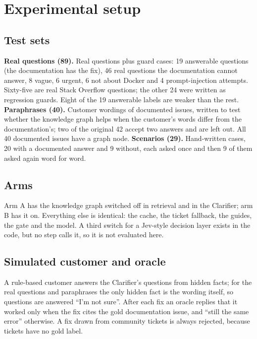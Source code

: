 \documentclass[cameraready]{ieeeconf}
\begin{document}
\section{Experimental setup}\label{sec:setup}
\subsection{Test sets}
\textbf{Real questions (89).} Real questions plus guard cases: 19 answerable questions (the documentation has the fix), 46 real questions the documentation cannot answer, 8 vague, 6 urgent, 6 not about Docker and 4 prompt-injection attempts. Sixty-five are real Stack Overflow questions; the other 24 were written as regression guards. Eight of the 19 answerable labels are weaker than the rest. \textbf{Paraphrases (40).} Customer wordings of documented issues, written to test whether the knowledge graph helps when the customer's words differ from the documentation's; two of the original 42 accept two answers and are left out. All 40 documented issues have a graph node. \textbf{Scenarios (29).} Hand-written cases, 20 with a documented answer and 9 without, each asked once and then 9 of them asked again word for word.

\subsection{Arms}
Arm A has the knowledge graph switched off in retrieval and in the Clarifier; arm B has it on. Everything else is identical: the cache, the ticket fallback, the guides, the gate and the model. A third switch for a Jev-style decision layer exists in the code, but no step calls it, so it is not evaluated here.

\subsection{Simulated customer and oracle}
A rule-based customer answers the Clarifier's questions from hidden facts; for the real questions and paraphrases the only hidden fact is the wording itself, so questions are answered ``I'm not sure''. After each fix an oracle replies that it worked only when the fix cites the gold documentation issue, and ``still the same error'' otherwise. A fix drawn from community tickets is always rejected, because tickets have no gold label.
\end{document}

